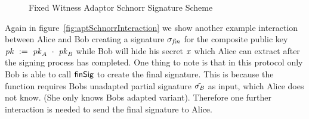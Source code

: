 \begin{figure}
    \begin{center}
        \fbox{
        \begin{varwidth}{\textwidth}
            \procedure[linenumbering]{$\procAptSig{\varSigPt}{\varWit}$}{
            (\varS \opSeperate \varRandAlice \opSeperate \varSigContext) \opFunResult \varSigPt \\
            \varSStar \opAssign \varS \opAddScalar \varWit \\
            \pcreturn \varSigApt \opAssign (\varSStar \opSeperate \varRandAlice \opSeperate \varSigContext)
            } \\
            \procedure[linenumbering]{$\procVerifyAptSig{\varSigAptAlice}{\varMsg}{\varPubKeyAlice}{\varStatement}$} {
            (\varSAlice \opSeperate \varRandAlice \opSeperate \varSigContext) \opFunResult \varSigAptAlice \\
            (\varPubKey \opSeperate \varRand) \opFunResult \varSigContext \\
            \varSchnorrChallenge \opAssign \funHash{\varMsg \opConc \varRand \opConc \varPubKey} \\
            \pcreturn \funGen{\varSAlice} \opEq \varRandAlice \opAddPoint \opPointScalar{\varPubKeyAlice}{\varSchnorrChallenge} \opAddPoint \varStatement
            }
            \procedure[linenumbering]{$\procExtWit{\varSigFin}{\varSigAlice}{\varSigAptBob}$}{
            (\varS \opSeperate \varRand) \opFunResult \varSigFin \\
            (\varSAlice \opSeperate \varRandAlice \opSeperate \varSigContext) \opFunResult \varSigAlice \\
            (\varSAptBob \opSeperate \varRandBob \opSeperate \varSigContext) \opFunResult \varSigAptBob \\
            \varSBob \opAssign \varS \opSub \varSAlice \\
            \varWit \opAssign \varSAptBob \opSub \varSBob \\
            \pcreturn (\varWit)
            }
        \end{varwidth}
        }
    \end{center}
    \caption{Fixed Witness Adaptor Schnorr Signature Scheme}
    \label{fig:aptSchnorr}
\end{figure}

Again in figure~\ref{fig:aptSchnorrInteraction} we show another example interaction between Alice and Bob creating a signature $\sigma_{\mathit{fin}}$ for the composite public key $\mathit{pk} ~:=~ \mathit{pk}_{\mathit{A}} ~\cdot~ \mathit{pk}_{\mathit{B}}$
while Bob will hide his secret $\mathit{x}$ which Alice can extract after the signing process has completed. One thing to note is that in this protocol only Bob is able to call $\mathsf{finSig}$ to create the final signature. This
is because the function requires Bobs unadapted partial signature $\tilde{\sigma_{\mathit{B}}}$ as input, which Alice does not know. (She only knows Bobs adapted variant). Therefore one further interaction is needed to send the final
signature to Alice.

